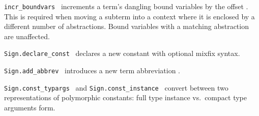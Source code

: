\begin{isabellebody}
\begin{isamarkuptext}
\begin{description}
  \item \verb|incr_boundvars|~ increments a term's dangling
  bound variables by the offset .  This is required when
  moving a subterm into a context where it is enclosed by a different
  number of abstractions.  Bound variables with a matching abstraction
  are unaffected.

  \item \verb|Sign.declare_const|~ declares
  a new constant  with optional mixfix syntax.

  \item \verb|Sign.add_abbrev|~
  introduces a new term abbreviation .

  \item \verb|Sign.const_typargs|~ and \verb|Sign.const_instance|~
  convert between two representations of polymorphic constants: full
  type instance vs.\ compact type arguments form.


\end{description}
\end{isamarkuptext}
\end{isabellebody}

